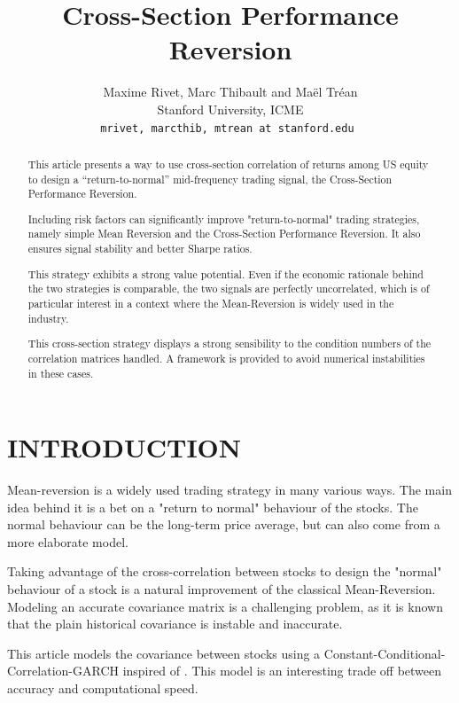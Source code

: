 \documentclass[letterpaper, 10 pt, conference]{ieeeconf}  %
\title{\LARGE \bf
Cross-Section Performance Reversion
}
\author{Maxime Rivet, Marc Thibault and Ma{\"e}l Tr{\'e}an\\ \small Stanford University, ICME\\\tt\small mrivet, marcthib, mtrean at stanford.edu%
}
\begin{document}
\maketitle
\thispagestyle{plain}
\pagestyle{plain}


\begin{abstract}
This article presents a way to use cross-section correlation of returns among US equity to design a “return-to-normal” mid-frequency trading signal, the Cross-Section Performance Reversion. 

Including risk factors can significantly improve "return-to-normal" trading strategies, namely simple Mean Reversion and the Cross-Section Performance Reversion. It also ensures signal stability and better Sharpe ratios. 

This strategy exhibits a strong value potential. Even if the economic rationale behind the two strategies is comparable, the two signals are perfectly uncorrelated, which is of particular interest in a context where the Mean-Reversion is widely used in the industry. 

This cross-section strategy displays a strong sensibility to the condition numbers of the correlation matrices handled. A framework is provided to avoid numerical instabilities in these cases.

\end{abstract}
\thispagestyle{empty}
\pagestyle{empty}




\section{INTRODUCTION}

Mean-reversion is a widely used trading strategy in many various ways. The main idea behind it is a bet on a "return to normal" behaviour of the stocks. The normal behaviour can be the long-term price average, but can also come from a more elaborate model.

Taking advantage of the cross-correlation between stocks to design the "normal" behaviour of a stock is a natural improvement of the classical Mean-Reversion. Modeling an accurate covariance matrix is a challenging problem, as it is known that the plain historical covariance is instable and inaccurate.

This article models the covariance between stocks using a Constant-Conditional-Correlation-GARCH inspired of \cite{c1}. This model is an interesting trade off between accuracy and computational speed.
\end{document}
